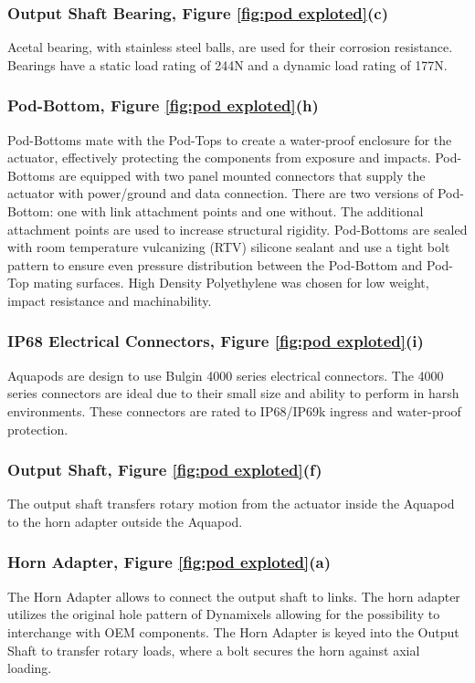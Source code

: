 \subsubsection{Output Shaft Bearing, Figure \ref{fig:pod exploted}(c)}
Acetal bearing, with stainless steel balls, are used for their corrosion resistance. Bearings have a static load rating of 244N and a dynamic load rating of 177N. 

\subsubsection{Pod-Bottom, Figure \ref{fig:pod exploted}(h)}
Pod-Bottoms mate with the Pod-Tops to create a water-proof enclosure for the actuator, effectively protecting the components from exposure and impacts. Pod-Bottoms are equipped with two panel mounted connectors that supply the actuator with power/ground and data connection. There are two versions of Pod-Bottom: one with link attachment points and one without. The additional attachment points are used to increase structural rigidity. Pod-Bottoms are sealed with room temperature vulcanizing (RTV) silicone sealant and use a tight bolt pattern to ensure even pressure distribution between the Pod-Bottom and Pod-Top mating surfaces.
High Density Polyethylene was chosen for low weight, impact resistance and machinability. 

\subsubsection{IP68 Electrical Connectors, Figure \ref{fig:pod exploted}(i)}
Aquapods are design to use Bulgin 4000 series electrical connectors. The 4000 series connectors are ideal due to their small size and ability to perform in harsh environments. These connectors are rated to IP68/IP69k ingress and water-proof protection. 


\subsubsection{Output Shaft, Figure \ref{fig:pod exploted}(f)}
The output shaft transfers rotary motion from the actuator inside the Aquapod to the horn adapter outside the Aquapod.

\subsubsection{Horn Adapter, Figure \ref{fig:pod exploted}(a)}
The Horn Adapter allows to connect the output shaft to links. The horn adapter utilizes the original hole pattern of Dynamixels allowing for the possibility to interchange with OEM components.
The Horn Adapter is keyed into the Output Shaft to transfer rotary loads, where a bolt secures the horn against axial loading. 

